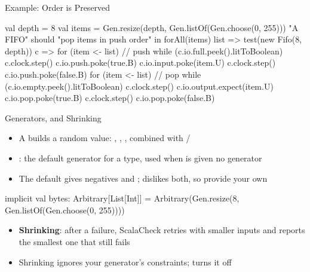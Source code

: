 \begin{frame}[fragile]{Example: Order is Preserved}
	\begin{chisel}[basicstyle=\scriptsize\ttfamily, aboveskip=0mm, belowskip=0mm]
val depth = 8
val items = Gen.resize(depth, Gen.listOf(Gen.choose(0, 255)))
"A FIFO" should "pop items in push order" in {
  forAll(items) { list =>
    test(new Fifo(8, depth)) { c =>
      for (item <- list) {  // push
        while (c.io.full.peek().litToBoolean) c.clock.step()
        c.io.push.poke(true.B)
        c.io.input.poke(item.U)
        c.clock.step()
        c.io.push.poke(false.B)
      }
      for (item <- list) {  // pop
        while (c.io.empty.peek().litToBoolean) c.clock.step()
        c.io.output.expect(item.U)
        c.io.pop.poke(true.B)
        c.clock.step()
        c.io.pop.poke(false.B)
      }
    }
  }
}
	\end{chisel}
\end{frame}

\begin{frame}[fragile]{Generators,  and Shrinking}
	\begin{itemize}
		\item A  builds a random value: , , , combined with /
		\item {}: the default generator for a type, used when  is given no generator
		\item The default  gives negatives and ;  dislikes both, so provide your own
	\end{itemize}
	\begin{chisel}[basicstyle=\scriptsize\ttfamily, aboveskip=1mm, belowskip=1mm]
implicit val bytes: Arbitrary[List[Int]] =
  Arbitrary(Gen.resize(8, Gen.listOf(Gen.choose(0, 255))))
	\end{chisel}
	\pause
	\begin{itemize}
		\item \textbf{Shrinking}: after a failure, ScalaCheck retries with smaller inputs and reports the smallest one that still fails
		\item Shrinking ignores your generator's constraints;  turns it off
	\end{itemize}
\end{frame}

